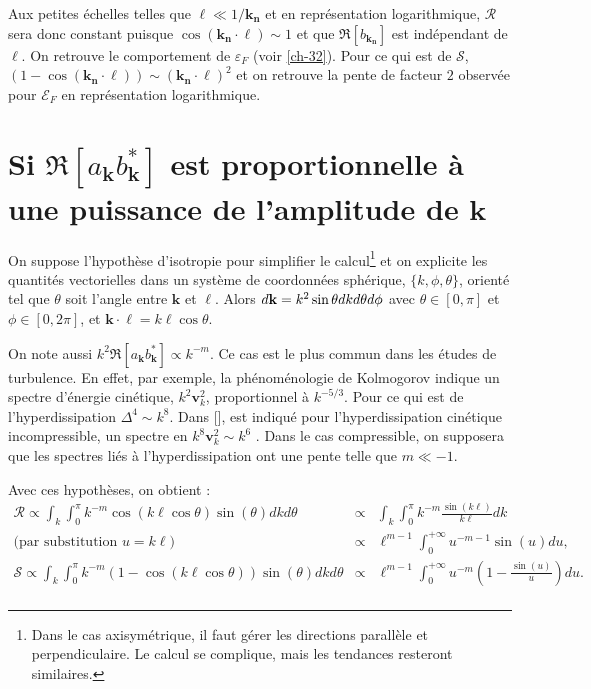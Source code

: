 Aux petites échelles telles que $\boldsymbol{\ell} \ll 1/\boldsymbol{k_n}$ et en représentation logarithmique, $\mathcal{R}$ sera donc constant puisque $ \cos\left(\boldsymbol{k_n}\cdot\boldsymbol{\ell}\right)\sim 1 $ et que $ \Re[b_{\boldsymbol{k_n}}]$ est indépendant de $\boldsymbol{\ell}$. On retrouve le comportement de $\varepsilon_{F}$ (voir \ref{ch-32}). Pour ce qui est de $\mathcal{S}$, $ \left(1-\cos\left(\boldsymbol{k_n}\cdot\boldsymbol{\ell}\right)\right) \sim \left(\boldsymbol{k_n}\cdot\boldsymbol{\ell}\right)^2$ et on retrouve la pente de facteur $2$  observée pour $\mathcal{E}_{F}$ en représentation logarithmique. 

\section{Si \ensuremath{\Re[a_{\boldsymbol{k}}  b^*_{\boldsymbol{k}}]} est proportionnelle à une puissance de l'amplitude de $\boldsymbol{k}$ } \label{an:sat}

On suppose l'hypothèse d'isotropie pour simplifier le calcul\footnote{Dans le cas axisymétrique, il faut gérer les directions parallèle et perpendiculaire. Le calcul se complique, mais les tendances resteront similaires.} et on explicite les quantités vectorielles dans un système de coordonnées sphérique,  $\{k,\phi,\theta\}$, orienté tel que $\theta$ soit l'angle entre $\boldsymbol{k}$ et $\boldsymbol{\ell}$. Alors $d{\bf k} = k^2 \sin \theta dk d\theta d\phi$ avec $\theta \in [0,\pi]$ et $\phi \in [0,2\pi]$, et $\boldsymbol{k}\cdot\boldsymbol{\ell} = k\ell \cos\theta$. 

On note aussi $k^{2} \Re[a_{\boldsymbol{k}}  b^*_{\boldsymbol{k}}] \propto k^{-m}$. Ce cas est le plus commun dans les études de turbulence. En effet, par exemple, la phénoménologie de Kolmogorov indique un spectre d'énergie cinétique,  $k^2 \boldsymbol{v}^2_k$, proportionnel à $k^{-5/3}$. Pour ce qui est de l'hyperdissipation $\Delta^4 \sim k^8$. Dans [\cite{ferrand_multi-scale_2021}], est indiqué pour l'hyperdissipation cinétique incompressible, un spectre en $k^8 \boldsymbol{v}^2_k \sim k^6$ . Dans le cas compressible, on supposera que les spectres liés à l'hyperdissipation ont une pente telle que $m \ll -1$.

Avec ces hypothèses, on obtient :
\begin{eqnarray}
\mathcal{R} \propto \int_k \int^{\pi}_0 k^{-m} \cos\left(k\ell \cos\theta\right) \sin\left(\theta\right)dk d\theta &\propto& \int_k \int^{\pi}_0 k^{-m} \frac{\sin\left(k\ell\right)}{k\ell} dk \nonumber\\
\textrm{(par substitution $u = k\ell$) } &\propto& \ell^{m-1} \int_0^{+\infty} u^{-m-1} \sin\left(u\right) du ,\quad \\
\mathcal{S} \propto \int_k \int^{\pi}_0 k^{-m}  \left(1-\cos\left(k\ell \cos\theta\right)\right) \sin\left(\theta\right)dk d\theta &\propto& \ell^{m-1} \int_0^{+\infty} u^{-m} \left(1-\frac{\sin\left(u\right)}{u}\right) du .\nonumber \\
\end{eqnarray}

